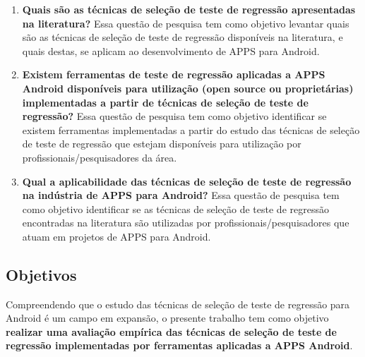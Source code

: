 \begin{enumerate}[label=\bf QP\arabic*,leftmargin=1.8cm]
    
    \item \textbf{Quais são as técnicas de seleção de teste de regressão apresentadas na literatura?} Essa questão de pesquisa tem como objetivo levantar quais são as técnicas de seleção de teste de regressão disponíveis na literatura, e quais destas, se aplicam ao desenvolvimento de \ac{APPS} para Android.
    
    \item \textbf{Existem ferramentas de teste de regressão aplicadas a \ac{APPS} Android disponíveis para utilização (open source ou proprietárias) implementadas a partir de técnicas de seleção de teste de regressão?} Essa questão de pesquisa tem como objetivo identificar se existem ferramentas implementadas a partir do estudo das técnicas de seleção de teste de regressão que estejam disponíveis para utilização por profissionais/pesquisadores da    área.
    
    
    \item \textbf{Qual a aplicabilidade das técnicas de seleção de teste de regressão na indústria de \ac{APPS} para Android?} Essa questão de pesquisa tem como objetivo identificar se as técnicas de seleção de teste de regressão encontradas na literatura são utilizadas por profissionais/pesquisadores que atuam em projetos de \ac{APPS} para Android.
    
    

\end{enumerate}



\subsection{Objetivos}

Compreendendo que o estudo das técnicas de seleção de teste de regressão para Android é um campo em expansão, o presente trabalho tem como objetivo \textbf{realizar uma avaliação empírica das técnicas de seleção de teste de regressão implementadas por ferramentas aplicadas a \ac{APPS} Android}.

